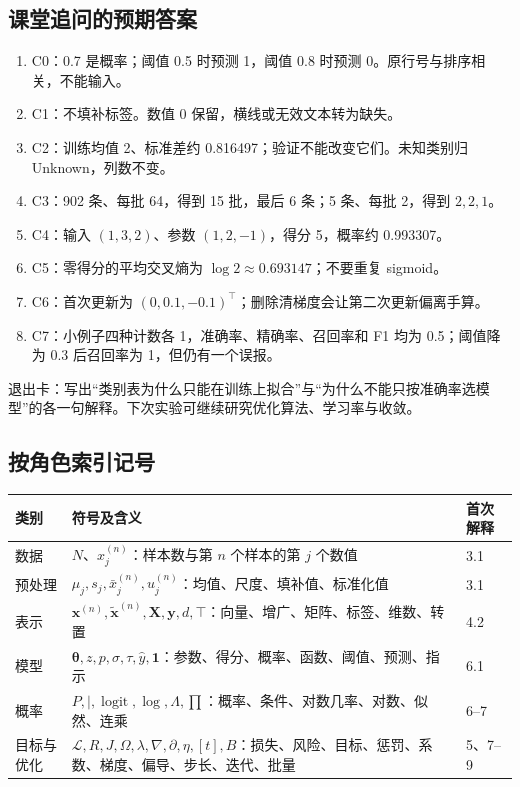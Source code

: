 \documentclass[UTF8,a4paper,11pt,fontset=fandol]{ctexart}
\begin{document}
\subsection{课堂追问的预期答案}
\begin{enumerate}
\item C0：0.7 是概率；阈值 0.5 时预测 1，阈值 0.8 时预测 0。原行号与排序相关，不能输入。
\item C1：不填补标签。数值 0 保留，横线或无效文本转为缺失。
\item C2：训练均值 2、标准差约 0.816497；验证不能改变它们。未知类别归 Unknown，列数不变。
\item C3：902 条、每批 64，得到 15 批，最后 6 条；5 条、每批 2，得到 $2,2,1$。
\item C4：输入 $(1,3,2)$、参数 $(1,2,-1)$，得分 5，概率约 0.993307。
\item C5：零得分的平均交叉熵为 $\log 2\approx0.693147$；不要重复 sigmoid。
\item C6：首次更新为 $(0,0.1,-0.1)^\top$；删除清梯度会让第二次更新偏离手算。
\item C7：小例子四种计数各 1，准确率、精确率、召回率和 F1 均为 0.5；阈值降为 0.3 后召回率为 1，但仍有一个误报。
\end{enumerate}
退出卡：写出“类别表为什么只能在训练上拟合”与“为什么不能只按准确率选模型”的各一句解释。下次实验可继续研究优化算法、学习率与收敛。
\subsection{按角色索引记号}
\par\noindent\begin{tabularx}{\linewidth}{L{2.3cm}Y L{1.8cm}}\toprule
类别 & 符号及含义 & 首次解释\\\midrule
数据 & $N$、$x_j^{(n)}$：样本数与第 $n$ 个样本的第 $j$ 个数值 & 3.1\\
预处理 & $\mu_j,s_j,\bar x_j^{(n)},u_j^{(n)}$：均值、尺度、填补值、标准化值 & 3.1\\
表示 & $\mathbf x^{(n)},\tilde{\mathbf x}^{(n)},\mathbf X,\mathbf y,d,\top$：向量、增广、矩阵、标签、维数、转置 & 4.2\\
模型 & $\boldsymbol\theta,z,p,\sigma,\tau,\hat y,\mathbf1$：参数、得分、概率、函数、阈值、预测、指示 & 6.1\\
概率 & $P,\mid,\operatorname{logit},\log,\Lambda,\prod$：概率、条件、对数几率、对数、似然、连乘 & 6--7\\
目标与优化 & $\mathcal L,R,J,\Omega,\lambda,\nabla,\partial,\eta,[t],B$：损失、风险、目标、惩罚、系数、梯度、偏导、步长、迭代、批量 & 5、7--9\\\bottomrule
\end{tabularx}
\clearpage
\end{document}
